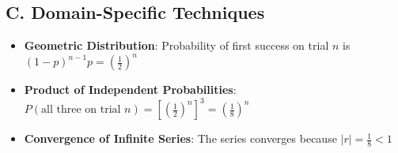 \documentclass[11pt]{article}
\begin{document}
\begin{tacticalbox}
\subsection*{C. Domain-Specific Techniques}
\begin{itemize}[leftmargin=*]
    \item \textbf{Geometric Distribution}: Probability of first success on trial $n$ is $(1-p)^{n-1}p = \left(\frac{1}{2}\right)^n$
    \item \textbf{Product of Independent Probabilities}: $P(\text{all three on trial } n) = \left[\left(\frac{1}{2}\right)^n\right]^3 = \left(\frac{1}{8}\right)^n$
    \item \textbf{Convergence of Infinite Series}: The series converges because $|r| = \frac{1}{8} < 1$
\end{itemize}
\end{tacticalbox}
\end{document}
